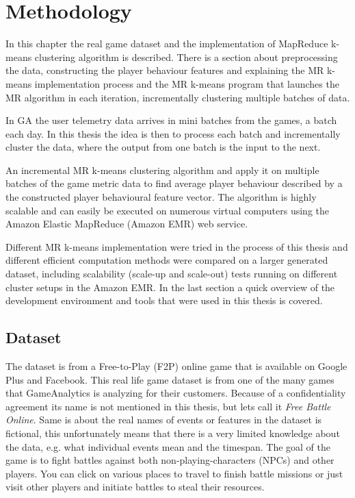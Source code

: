 
\chapter{Methodology} %
\label{Chapter4}
In this chapter the real game dataset and the implementation of MapReduce k-means clustering algorithm is described. There is a section about preprocessing the data, constructing the player behaviour features and explaining the MR k-means implementation process and the MR k-means program that launches the MR algorithm in each iteration, incrementally clustering multiple batches of data. 

In GA the user telemetry data arrives in mini batches from the games, a batch each day. In this thesis the idea is then to process each batch and incrementally cluster the data, where the output from one batch is the input to the next.

An incremental MR k-means clustering algorithm and apply it on multiple batches of the game metric data to find average player behaviour described by a the constructed player behavioural feature vector. The algorithm is highly scalable and can easily be executed on numerous virtual computers using the Amazon Elastic MapReduce (Amazon EMR) web service. 

Different MR k-means implementation were tried in the process of this thesis and different efficient computation methods were compared on a larger generated dataset, including scalability (scale-up and scale-out) tests running on different cluster setups in the Amazon EMR. In the last section a quick overview of the development environment and tools that were used in this thesis is covered.

\section{Dataset}
\label{sec:realdataset}
The dataset is from a Free-to-Play (F2P) online game that is available on Google Plus and Facebook. This real life game dataset is from one of the many games that GameAnalytics is analyzing for their customers. Because of a confidentiality agreement its name is not mentioned in this thesis, but lets call it \textit{Free Battle Online}. Same is about the real names of events or features in the dataset is fictional, this unfortunately means that there is a very limited knowledge about the data, e.g. what individual events mean and the timespan. The goal of the game is to fight battles against both non-playing-characters (NPCs) and other players. You can click on various places to travel to finish battle missions or just visit other players and initiate battles to steal their resources.

